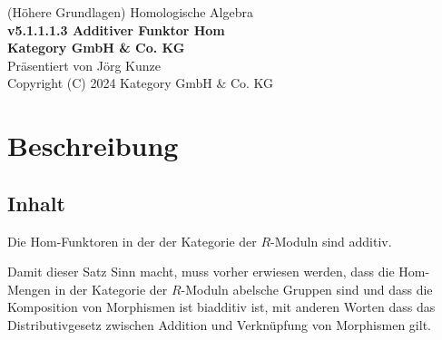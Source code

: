 \documentclass[a4paper]{amsart}
\theoremstyle{definition}
\begin{document}
\begin{titlepage}
\centering
{\huge
(Höhere Grundlagen) Homologische Algebra\\[1cm]
\textbf{v5.1.1.1.3 Additiver Funktor Hom}
}\\[1cm]

\textbf{Kategory GmbH \& Co. KG}\\
Präsentiert von Jörg Kunze\\
Copyright (C) 2024 Kategory GmbH \& Co. KG

\end{titlepage}

%

\newpage

\section*{Beschreibung}

\subsection*{Inhalt}
Die Hom-Funktoren in der der Kategorie der $R$-Moduln sind additiv.

Damit dieser Satz Sinn macht, muss vorher erwiesen werden, dass die Hom-Mengen in der Kategorie der $R$-Moduln abelsche Gruppen sind und dass die Komposition von Morphismen ist biadditiv ist, mit anderen Worten dass das Distributivgesetz zwischen Addition und Verknüpfung von Morphismen gilt.
\end{document}
